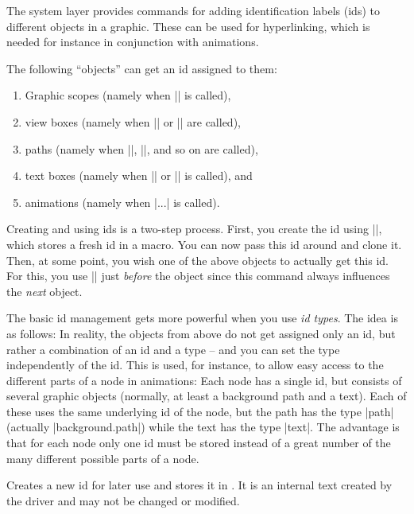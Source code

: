The system layer provides commands for adding identification labels
(ids) to different objects in a graphic. These can be used for
hyperlinking, which is needed for instance in conjunction with
animations.

The following ``objects'' can get an id assigned to them:
\begin{enumerate}
\item Graphic scopes (namely when |\pgfsys@begin@idscope| is called),
\item view boxes (namely when |\pgfsys@viewboxmeet| or |\pgfsys@viewboxslice| are called),
\item paths (namely when |\pgfsys@fill|, |\pgfsys@stroke|, and so on are called),
\item text boxes (namely when |\pgfsys@hbox| or |\pgfsys@hboxsynced| is called), and
\item animations (namely when |\pgfsys@animate...| is called).
\end{enumerate}


Creating and using ids is a two-step process. First, you create the
id using |\pgfsys@new@id|, which stores a fresh id in a macro. You can
now pass this id around and clone it. Then, at some point, you wish
one of the above objects to actually get this id. For this, you use
|\pgfsys@use@id| just \emph{before} the object since this command
always influences the \emph{next} object.

The basic id management gets more powerful when you use \emph{id
  types}. The idea is as follows: In reality, the objects from above
do not get assigned only an id, but rather a combination of an id and
a type -- and you can set the type independently of the id. This is
used, for instance, to allow easy access to the different parts of a
node in animations: Each node has a single id, but consists of several
graphic objects (normally, at least a background path and a
text). Each of these uses the same underlying id of the node, but the
path has the type |path| (actually |background.path|) while the text
has the type |text|. The advantage is that for each node only one id
must be stored instead of a great number of the many different
possible parts of a node.

\begin{command}{\pgfsys@new@id{}}
  Creates a new id for later use and stores it in . It is
  an internal text created by the driver and may not be changed or
  modified. 
\end{command}

